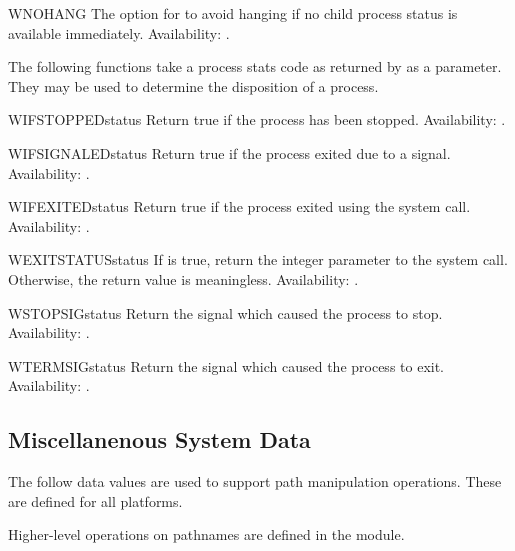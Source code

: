 \begin{datadesc}{WNOHANG}
The option for  to avoid hanging if no child
process status is available immediately.
Availability: \UNIX{}.
\end{datadesc}

The following functions take a process stats code as returned by
 as a parameter.  They may be used to determine
the disposition of a process.

\begin{funcdesc}{WIFSTOPPED}{status}
Return true if the process has been stopped.
Availability: \UNIX{}.
\end{funcdesc}

\begin{funcdesc}{WIFSIGNALED}{status}
Return true if the process exited due to a signal.
Availability: \UNIX{}.
\end{funcdesc}

\begin{funcdesc}{WIFEXITED}{status}
Return true if the process exited using the  system
call.
Availability: \UNIX{}.
\end{funcdesc}

\begin{funcdesc}{WEXITSTATUS}{status}
If  is true, return the integer
parameter to the  system call.  Otherwise, the return 
value is meaningless.
Availability: \UNIX{}.
\end{funcdesc}

\begin{funcdesc}{WSTOPSIG}{status}
Return the signal which caused the process to stop.
Availability: \UNIX{}.
\end{funcdesc}

\begin{funcdesc}{WTERMSIG}{status}
Return the signal which caused the process to exit.
Availability: \UNIX{}.
\end{funcdesc}


\subsection{Miscellanenous System Data \label{os-path}}

The follow data values are used to support path manipulation
operations.  These are defined for all platforms.

Higher-level operations on pathnames are defined in the
 module.


